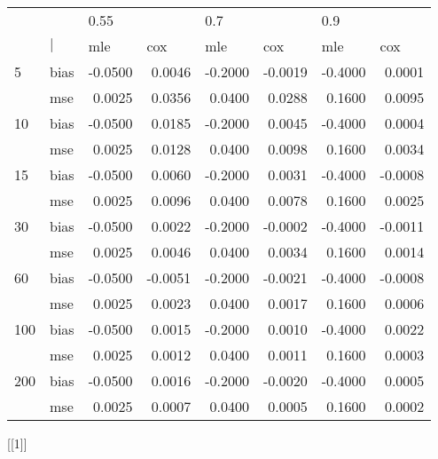\begin{table}[ht]
\centering
\begin{tabular}{ll rrrrrr}
  \toprule
     &            & \multicolumn{1}{l}{    0.55} & \multicolumn{1}{l}{        } & \multicolumn{1}{l}{     0.7} & \multicolumn{1}{l}{        } & \multicolumn{1}{l}{     0.9} & \multicolumn{1}{l}{        } \\ 
      &  $\vert$  & \multicolumn{1}{l}{     mle} & \multicolumn{1}{l}{     cox} & \multicolumn{1}{l}{     mle} & \multicolumn{1}{l}{     cox} & \multicolumn{1}{l}{     mle} & \multicolumn{1}{l}{     cox} \\ 
   \midrule
5   & bias       & -0.0500 &  0.0046 & -0.2000 & -0.0019 & -0.4000 &  0.0001 \\ 
      & mse        &  0.0025 &  0.0356 &  0.0400 &  0.0288 &  0.1600 &  0.0095 \\ 
  10  & bias       & -0.0500 &  0.0185 & -0.2000 &  0.0045 & -0.4000 &  0.0004 \\ 
      & mse        &  0.0025 &  0.0128 &  0.0400 &  0.0098 &  0.1600 &  0.0034 \\ 
  15  & bias       & -0.0500 &  0.0060 & -0.2000 &  0.0031 & -0.4000 & -0.0008 \\ 
      & mse        &  0.0025 &  0.0096 &  0.0400 &  0.0078 &  0.1600 &  0.0025 \\ 
  30  & bias       & -0.0500 &  0.0022 & -0.2000 & -0.0002 & -0.4000 & -0.0011 \\ 
      & mse        &  0.0025 &  0.0046 &  0.0400 &  0.0034 &  0.1600 &  0.0014 \\ 
  60  & bias       & -0.0500 & -0.0051 & -0.2000 & -0.0021 & -0.4000 & -0.0008 \\ 
      & mse        &  0.0025 &  0.0023 &  0.0400 &  0.0017 &  0.1600 &  0.0006 \\ 
  100 & bias       & -0.0500 &  0.0015 & -0.2000 &  0.0010 & -0.4000 &  0.0022 \\ 
      & mse        &  0.0025 &  0.0012 &  0.0400 &  0.0011 &  0.1600 &  0.0003 \\ 
  200 & bias       & -0.0500 &  0.0016 & -0.2000 & -0.0020 & -0.4000 &  0.0005 \\ 
      & mse        &  0.0025 &  0.0007 &  0.0400 &  0.0005 &  0.1600 &  0.0002 \\ 
   \bottomrule
\end{tabular}
\end{table}
[[1]]
